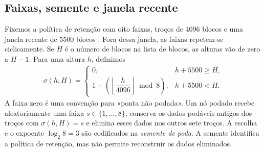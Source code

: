 \subsection{Faixas, semente e janela recente}
\label{subsec:pruning-stripes}

%
Fixemos a política de retenção com oito faixas, troços de 4096 blocos e uma
janela recente de 5500 blocos \cite{monero-source-v16}. Fora dessa janela,
as faixas repetem-se ciclicamente. Se \(H\) é o número de blocos na lista de blocos,
as alturas vão de zero a \(H-1\). Para uma altura \(h\), definimos
\begin{align}
 \sigma(h,H)=
 \begin{cases}
  0,&h+5500\geq H,\\[1mm]
  1+\left(\left\lfloor\dfrac{h}{4096}\right\rfloor\bmod8\right),
     &h+5500<H.
 \end{cases}
 \label{eq:pruning-stripe}
\end{align}
A faixa zero é uma convenção para «ponta não podada». Um nó podado recebe
aleatoriamente uma faixa \(s\in\{1,\ldots,8\}\), conserva os dados podáveis
antigos dos troços com \(\sigma(h,H)=s\) e elimina esses dados nos outros sete
troços. A escolha e o expoente \(\log_2 8=3\) são codificados na
\emph{semente de poda}. A semente identifica a política de retenção, mas não
permite reconstruir os dados eliminados.


\begin{center}
\end{center}

